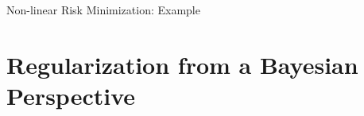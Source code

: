 \begin{frame}{Non-linear Risk Minimization: Example}


\end{frame}


\section{Regularization from a Bayesian Perspective}

